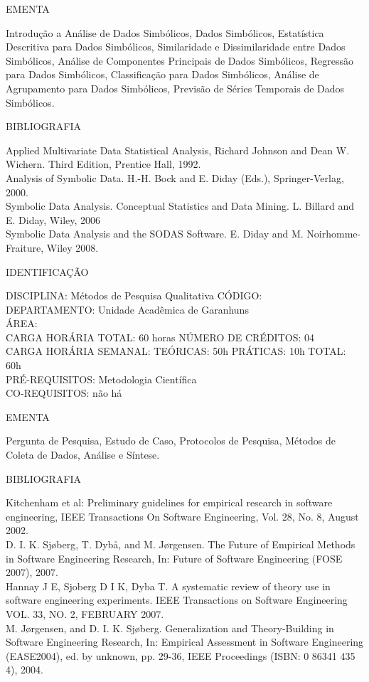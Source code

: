 \documentclass[
	12pt,				%
	openright,			%
  oneside,     %
	a4paper,			%
	chapter=TITLE,		%
	english,			%
	french,				%
	spanish,			%
	brazil				%
	]{abntex2}
\begin{document}
\begin{apendicesenv}
EMENTA 

Introdução a Análise de Dados Simbólicos, Dados Simbólicos, Estatística
Descritiva para Dados Simbólicos, Similaridade e Dissimilaridade entre
Dados Simbólicos, Análise de Componentes Principais de Dados
Simbólicos, Regressão para Dados Simbólicos, Classificação para Dados
Simbólicos, Análise de Agrupamento para Dados Simbólicos, Previsão de
Séries Temporais de Dados Simbólicos.

BIBLIOGRAFIA 

Applied Multivariate Data Statistical Analysis, Richard Johnson and Dean
W. Wichern. Third Edition, Prentice Hall, 1992.\\
Analysis of Symbolic Data. H.-H. Bock and E. Diday (Eds.),
Springer-Verlag, 2000.\\
Symbolic Data Analysis. Conceptual Statistics and Data Mining. L.
Billard and E. Diday, Wiley, 2006\\
Symbolic Data Analysis and the SODAS Software. E. Diday and M.
Noirhomme-Fraiture, Wiley 2008.

\newpage IDENTIFICAÇÃO

DISCIPLINA: Métodos de Pesquisa Qualitativa CÓDIGO: \\
DEPARTAMENTO: Unidade Acadêmica de Garanhuns\\
ÁREA: \\
CARGA HORÁRIA TOTAL: 60 horas NÚMERO DE CRÉDITOS: 04\\
CARGA HORÁRIA SEMANAL: TEÓRICAS: 50h PRÁTICAS: 10h TOTAL: 60h\\
PRÉ-REQUISITOS: Metodologia Científica\\
CO-REQUISITOS: não há

EMENTA 

Pergunta de Pesquisa, Estudo de Caso, Protocolos de Pesquisa, Métodos de
Coleta de Dados, Análise e Síntese.

BIBLIOGRAFIA 

Kitchenham et al: Preliminary guidelines for empirical research in
software engineering, IEEE Transactions On Software Engineering, Vol.
28, No. 8, August 2002.\\
D. I. K. Sjøberg, T. Dybå, and M. Jørgensen. The Future of Empirical
Methods in Software Engineering Research, In: Future of Software
Engineering (FOSE 2007), 2007.\\
Hannay J E, Sjoberg D I K, Dyba T. A systematic review of theory use in
software engineering experiments. IEEE Transactions on Software
Engineering VOL. 33, NO. 2, FEBRUARY 2007.\\
M. Jørgensen, and D. I. K. Sjøberg. Generalization and Theory-Building
in Software Engineering Research, In: Empirical Assessment in Software
Engineering (EASE2004), ed. by unknown, pp. 29-36, IEEE Proceedings
(ISBN: 0 86341 435 4), 2004.


\end{apendicesenv}
\end{document}
